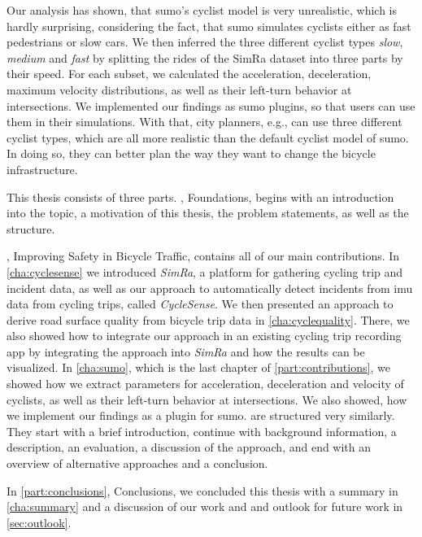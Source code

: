 \begin{itemize}
Our analysis has shown, that \ac{sumo}'s cyclist model is very unrealistic, which is hardly surprising, considering the fact, that \ac{sumo} simulates cyclists either as fast pedestrians or slow cars.
We then inferred the three different cyclist types \textit{slow}, \textit{medium} and \textit{fast} by splitting  the rides of the SimRa dataset into three parts by their speed.
For each subset, we calculated the acceleration, deceleration, maximum velocity distributions, as well as their left-turn behavior at intersections.
We implemented our findings as \ac{sumo} plugins, so that users can use them in their simulations.
With that, city planners, e.g., can use three different cyclist types, which are all more realistic than the default cyclist model of \ac{sumo}.
In doing so, they can better plan the way they want to change the bicycle infrastructure. 
\end{itemize}

This thesis consists of three parts. , Foundations, begins with an introduction into the topic, a motivation of this thesis, the problem statements, as well as the structure.

, Improving Safety in Bicycle Traffic, contains all of our main contributions.
In \cref{cha:cyclesense} we introduced \textit{SimRa}, a platform for gathering cycling trip and incident data, as well as our approach to automatically detect incidents from \ac{imu} data from cycling trips, called \textit{CycleSense}.
We then presented an approach to derive road surface quality from bicycle trip data in \cref{cha:cyclequality}.
There, we also showed how to integrate our approach in an existing cycling trip recording app by integrating the approach into \textit{SimRa} and how the results can be visualized.
In \cref{cha:sumo}, which is the last chapter of \cref{part:contributions}, we showed how we extract parameters for acceleration, deceleration and velocity of cyclists, as well as their left-turn behavior at intersections.
We also showed, how we implement our findings as a plugin for \ac{sumo}.
 are structured very similarly.
They start with a brief introduction, continue with background information, a description, an evaluation, a discussion of the approach, and end with an overview of alternative approaches and a conclusion.

In \cref{part:conclusions}, Conclusions, we concluded this thesis with a summary in \cref{cha:summary} and a discussion of our work and and outlook for future work in \cref{sec:outlook}.
